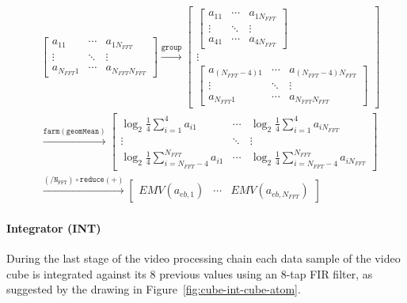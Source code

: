 \documentclass[
  a4paper,
]{article}
\let\oldparagraph\paragraph
\renewcommand{\paragraph}[1]{\oldparagraph{#1}\mbox{}}
\begin{document}
\begin{equation}\begin{aligned}
  &\begin{bmatrix}
  a_{11} & \cdots & a_{1N_{FFT}} \\
  \vdots  & \ddots & \vdots \\
  a_{N_{FFT}1}  & \cdots & a_{N_{FFT}N_{FFT}}
  \end{bmatrix}
  \stackrel{\mathtt{group}}{\rightarrow}
  \begin{bmatrix}
  \begin{bmatrix}
  a_{11} & \cdots & a_{1N_{FFT}} \\
  \vdots & \ddots & \vdots \\
  a_{41} & \cdots & a_{4N_{FFT}}
  \end{bmatrix}\\
  \vdots \\
  \begin{bmatrix}
  a_{(N_{FFT}-4)1}  & \cdots & a_{(N_{FFT}-4)N_{FFT}}\\
  \vdots & \ddots & \vdots \\
  a_{N_{FFT}1}  & \cdots & a_{N_{FFT}N_{FFT}}
  \end{bmatrix}
  \end{bmatrix}\\
  &\stackrel{\mathtt{farm(geomMean)}}{\rightarrow}
  \begin{bmatrix}
  \log_2\frac{1}{4}\sum_{i=1}^{4}a_{i1} & \cdots & \log_2\frac{1}{4}\sum_{i=1}^{4}a_{iN_{FFT}} \\
  \vdots & \ddots & \vdots \\
  \log_2\frac{1}{4}\sum_{i=N_{FFT}-4}^{N_{FFT}}a_{i1} & \cdots & \log_2\frac{1}{4}\sum_{i=N_{FFT}-4}^{N_{FFT}}a_{iN_{FFT}}
  \end{bmatrix}\\
  &\stackrel{\mathtt{(/N_{FFT})\circ reduce(+)}}{\rightarrow}
  \begin{bmatrix}
  EMV(a_{eb,1}) & \cdots & EMV(a_{eb,N_{FFT}}) 
  \end{bmatrix}
  \end{aligned}
\label{eq:cfar-emv}\end{equation}

\hypertarget{sec:cube-int-atom}{%
\paragraph{Integrator (INT)}\label{sec:cube-int-atom}}

During the last stage of the video processing chain each data sample of
the video cube is integrated against its 8 previous values using an
8-tap FIR filter, as suggested by the drawing in
Figure~\ref{fig:cube-int-cube-atom}.
\end{document}
